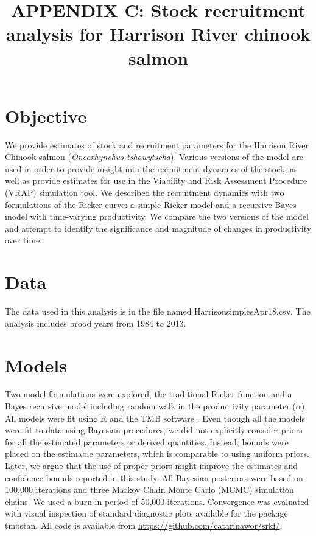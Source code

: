 \documentclass{article}
\title{APPENDIX C: Stock recruitment analysis for Harrison River chinook salmon}
\date{}
\begin{document}
\maketitle

\tableofcontents

\section{Objective}

 We provide estimates of stock and recruitment parameters for the Harrison River Chinook salmon (\emph{Oncorhynchus tshawytscha}). Various versions of the model are used in order to provide insight into the recruitment dynamics of the stock, as well as provide estimates for use in the Viability and Risk Assessment Procedure (VRAP) simulation tool. We described the recruitment dynamics with two formulations of the Ricker curve: a simple Ricker model and a recursive Bayes model with time-varying productivity. We compare the two versions of the model and attempt to identify the significance and magnitude of changes in productivity over time.


\section{Data}
 The data used in this analysis is in the file named Harrison\textunderscore simples\textunderscore Apr18.csv. The analysis includes brood years from 1984 to 2013. 



\section{Models}

Two model formulations were explored, the traditional Ricker function and a Bayes recursive model including random walk in the productivity  parameter ($\alpha$). All models were fit using R \citep{r_development_core_team_r:_2008} and the TMB software \citep{kristensen_tmb:_2016}.  Even though all the models were fit to data using Bayesian procedures, we did not explicitly consider priors for all the estimated parameters or derived quantities. Instead, bounds were placed on the estimable parameters, which is comparable to using uniform priors. Later, we argue that the use of proper priors might improve the estimates and confidence bounds reported in this study. All Bayesian posteriors were based on 100,000 iterations and three Markov Chain Monte Carlo (MCMC) simulation chains. We used a burn in period of 50,000 iterations. Convergence was evaluated with visual inspection of standard diagnostic plots available for the package tmbstan. All code is available from \url{https://github.com/catarinawor/srkf/}. 
\end{document}
